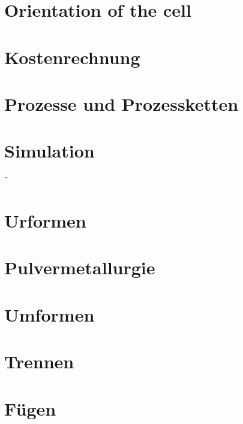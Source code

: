 \documentclass[12pt]{cheatsheet}
\author{Gian Maria Ernst - ernstg}
\begin{document}
\small


\section*{Orientation of the cell}


\section*{Kostenrechnung}

\section*{Prozesse und Prozessketten}

\section*{Simulation}
¨
\section*{Urformen}

\section*{Pulvermetallurgie}

\section*{Umformen}

\section*{Trennen}

\section*{Fügen}
\end{document}
